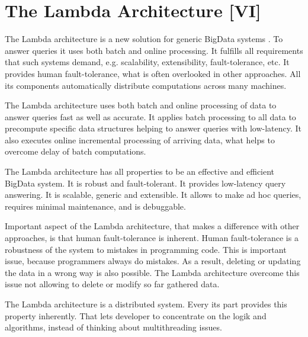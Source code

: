 \chapter{The Lambda Architecture [VI]}
\label{chap:lambda_architecture}


The Lambda architecture is a new solution for generic BigData systems \cite{MarzWarren201401}.
To answer queries it uses both batch and online processing.
It fulfills all requirements that such systems demand, e.g. scalability, extensibility, fault-tolerance, etc.
It provides human fault-tolerance, what is often overlooked in other approaches.
All its components automatically distribute computations across many machines.


The Lambda architecture uses both batch and online processing of data to answer queries fast as well as accurate.
It applies batch processing to all data to precompute specific data structures helping to answer queries with low-latency.
It also executes online incremental processing of arriving data, what helps to overcome delay of batch computations.

The Lambda architecture has all properties to be an effective and efficient BigData system.
It is robust and fault-tolerant.
It provides low-latency query answering.
It is scalable, generic and extensible.
It allows to make ad hoc queries, requires minimal maintenance, and is debuggable.

Important aspect of the Lambda architecture, that makes a difference with other approaches, is that human fault-tolerance is inherent.
Human fault-tolerance is a robustness of the system to mistakes in programming code.
This is important issue, because programmers always do mistakes.
As a result, deleting or updating the data in a wrong way is also possible.
The Lambda architecture overcome this issue not allowing to delete or modify so far gathered data.

The Lambda architecture is a distributed system.
Every its part provides this property inherently.
That lets developer to concentrate on the logik and algorithms, instead of thinking about multithreading issues.






